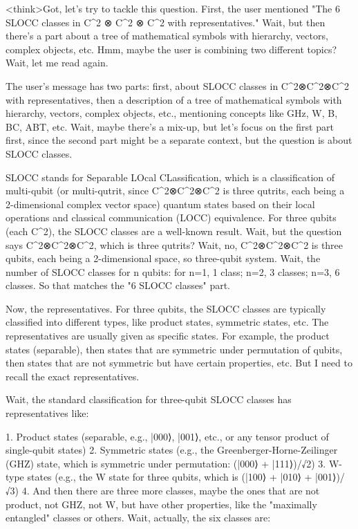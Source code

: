 <think>Got, let's try to tackle this question. First, the user mentioned "The 6 SLOCC classes in C^2 ⊗ C^2 ⊗ C^2 with representatives." Wait, but then there's a part about a tree of mathematical symbols with hierarchy, vectors, complex objects, etc. Hmm, maybe the user is combining two different topics? Wait, let me read again.

The user's message has two parts: first, about SLOCC classes in C^2⊗C^2⊗C^2 with representatives, then a description of a tree of mathematical symbols with hierarchy, vectors, complex objects, etc., mentioning concepts like GHz, W, B, BC, ABT, etc. Wait, maybe there's a mix-up, but let's focus on the first part first, since the second part might be a separate context, but the question is about SLOCC classes.

SLOCC stands for Separable LOcal CLassification, which is a classification of multi-qubit (or multi-qutrit, since C^2⊗C^2⊗C^2 is three qutrits, each being a 2-dimensional complex vector space) quantum states based on their local operations and classical communication (LOCC) equivalence. For three qubits (each C^2), the SLOCC classes are a well-known result. Wait, but the question says C^2⊗C^2⊗C^2, which is three qutrits? Wait, no, C^2⊗C^2⊗C^2 is three qubits, each being a 2-dimensional space, so three-qubit system. Wait, the number of SLOCC classes for n qubits: for n=1, 1 class; n=2, 3 classes; n=3, 6 classes. So that matches the "6 SLOCC classes" part.

Now, the representatives. For three qubits, the SLOCC classes are typically classified into different types, like product states, symmetric states, etc. The representatives are usually given as specific states. For example, the product states (separable), then states that are symmetric under permutation of qubits, then states that are not symmetric but have certain properties, etc. But I need to recall the exact representatives.

Wait, the standard classification for three-qubit SLOCC classes has representatives like:

1. Product states (separable, e.g., |000⟩, |001⟩, etc., or any tensor product of single-qubit states)
2. Symmetric states (e.g., the Greenberger-Horne-Zeilinger (GHZ) state, which is symmetric under permutation: (|000⟩ + |111⟩)/√2)
3. W-type states (e.g., the W state for three qubits, which is (|100⟩ + |010⟩ + |001⟩)/√3)
4. And then there are three more classes, maybe the ones that are not product, not GHZ, not W, but have other properties, like the "maximally entangled" classes or others. Wait, actually, the six classes are:

